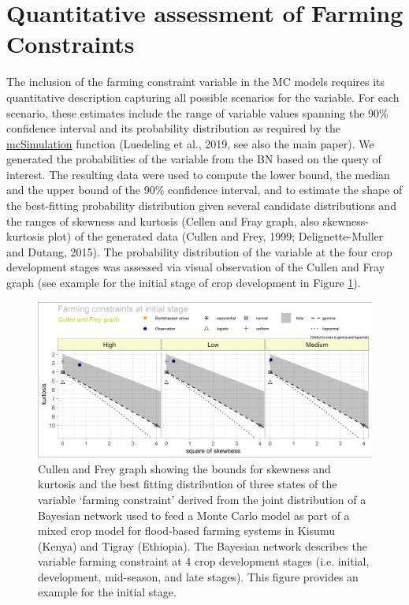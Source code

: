 \documentclass[]{elsarticle} %
\begin{document}
\hypertarget{refs3}{%
\section{Quantitative assessment of Farming Constraints}\label{refs3}}

The inclusion of the farming constraint variable in the MC models requires its quantitative description capturing all possible scenarios for the variable. For each scenario, these estimates include the range of variable values spanning the 90\% confidence interval and its probability distribution as required by the \href{https://www.rdocumentation.org/packages/decisionSupport/versions/1.103.8/topics/mcSimulation}{mcSimulation} function (Luedeling et al., 2019, see also the main paper). We generated the probabilities of the variable from the BN based on the query of interest. The resulting data were used to compute the lower bound, the median and the upper bound of the 90\% confidence interval, and to estimate the shape of the best-fitting probability distribution given several candidate distributions and the ranges of skewness and kurtosis (Cellen and Fray graph, also skewness-kurtosis plot) of the generated data (Cullen and Frey, 1999; Delignette-Muller and Dutang, 2015). The probability distribution of the variable at the four crop development stages was assessed via visual observation of the Cullen and Fray graph (see example for the initial stage of crop development in Figure \ref{fig:fig7}).

\begin{figure}[!h]

{\centering \includegraphics[width=1\linewidth,]{figures/Local_constraints_at_initial_stage_ggplot_distributions} 

}

\caption{Cullen and Frey graph showing the bounds for skewness and kurtosis and the best fitting distribution of three states of the variable ‘farming constraint’ derived from the joint distribution of a Bayesian network used to feed a Monte Carlo model as part of a mixed crop model for flood-based farming systems in Kisumu (Kenya) and Tigray (Ethiopia). The Bayesian network describes the variable farming constraint at 4 crop development stages (i.e. initial, development, mid-season, and late stages). This figure provides an example for the initial stage.}\label{fig:fig7}
\end{figure}
\end{document}
